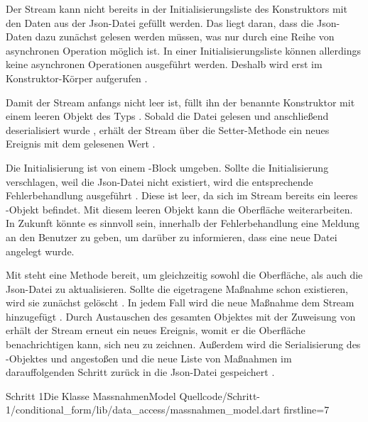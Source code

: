 Der Stream kann nicht bereits in der Initialisierungsliste des Konstruktors mit den Daten aus der Json-Datei gefüllt werden. Das liegt daran, dass die Json-Daten dazu zunächst gelesen werden müssen, was nur durch eine Reihe von asynchronen Operation möglich ist. In einer Initialisierungsliste können allerdings keine asynchronen Operationen ausgeführt werden. Deshalb wird  erst im Konstruktor-Körper aufgerufen .

Damit der Stream anfangs nicht leer ist, füllt ihn der benannte Konstruktor  mit einem leeren Objekt des Typs  . Sobald die Datei gelesen  und anschließend deserialisiert wurde , erhält der Stream über die Setter-Methode  ein neues Ereignis mit dem gelesenen Wert .

Die Initialisierung ist von einem -Block umgeben. Sollte die Initialisierung verschlagen, weil die Json-Datei nicht existiert, wird die entsprechende Fehlerbehandlung ausgeführt . Diese ist leer, da sich im Stream bereits ein leeres -Objekt  befindet. Mit diesem leeren Objekt kann die Oberfläche weiterarbeiten. In Zukunft könnte es sinnvoll sein, innerhalb der Fehlerbehandlung eine Meldung an den Benutzer zu geben, um darüber zu informieren, dass eine neue Datei angelegt wurde.

Mit   steht eine Methode bereit, um gleichzeitig  sowohl die Oberfläche,  als auch die Json-Datei zu aktualisieren. Sollte die eigetragene Maßnahme schon existieren, wird sie zunächst gelöscht . In jedem Fall wird die neue Maßnahme dem Stream hinzugefügt . Durch Austauschen des gesamten Objektes mit der Zuweisung von   erhält der Stream erneut ein neues Ereignis, womit er die Oberfläche benachrichtigen kann, sich neu zu zeichnen. Außerdem wird die Serialisierung des -Objektes und angestoßen  und die neue Liste von Maßnahmen im darauffolgenden Schritt zurück in die Json-Datei gespeichert .

\begin{alexlisting}{Schritt 1}{Die Klasse MassnahmenModel}
  {Quellcode/Schritt-1/conditional_form/lib/data_access/massnahmen_model.dart}
  {firstline=7}
  \label{lst:Schritt1KlasseMassnahmenModel}
\end{alexlisting}

\clearpage
